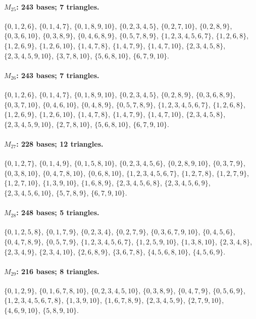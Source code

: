 \paragraph{$M_{25}$: 243 bases; 7 triangles.}
\(\{0,1,2,6\}\), \(\{0,1,4,7\}\), \(\{0,1,8,9,10\}\), \(\{0,2,3,4,5\}\), \(\{0,2,7,10\}\), \(\{0,2,8,9\}\), \(\{0,3,6,10\}\), \(\{0,3,8,9\}\), \(\{0,4,6,8,9\}\), \(\{0,5,7,8,9\}\), \(\{1,2,3,4,5,6,7\}\), \(\{1,2,6,8\}\), \(\{1,2,6,9\}\), \(\{1,2,6,10\}\), \(\{1,4,7,8\}\), \(\{1,4,7,9\}\), \(\{1,4,7,10\}\), \(\{2,3,4,5,8\}\), \(\{2,3,4,5,9,10\}\), \(\{3,7,8,10\}\), \(\{5,6,8,10\}\), \(\{6,7,9,10\}\).

\paragraph{$M_{26}$: 243 bases; 7 triangles.}
\(\{0,1,2,6\}\), \(\{0,1,4,7\}\), \(\{0,1,8,9,10\}\), \(\{0,2,3,4,5\}\), \(\{0,2,8,9\}\), \(\{0,3,6,8,9\}\), \(\{0,3,7,10\}\), \(\{0,4,6,10\}\), \(\{0,4,8,9\}\), \(\{0,5,7,8,9\}\), \(\{1,2,3,4,5,6,7\}\), \(\{1,2,6,8\}\), \(\{1,2,6,9\}\), \(\{1,2,6,10\}\), \(\{1,4,7,8\}\), \(\{1,4,7,9\}\), \(\{1,4,7,10\}\), \(\{2,3,4,5,8\}\), \(\{2,3,4,5,9,10\}\), \(\{2,7,8,10\}\), \(\{5,6,8,10\}\), \(\{6,7,9,10\}\).

\paragraph{$M_{27}$: 228 bases; 12 triangles.}
\(\{0,1,2,7\}\), \(\{0,1,4,9\}\), \(\{0,1,5,8,10\}\), \(\{0,2,3,4,5,6\}\), \(\{0,2,8,9,10\}\), \(\{0,3,7,9\}\), \(\{0,3,8,10\}\), \(\{0,4,7,8,10\}\), \(\{0,6,8,10\}\), \(\{1,2,3,4,5,6,7\}\), \(\{1,2,7,8\}\), \(\{1,2,7,9\}\), \(\{1,2,7,10\}\), \(\{1,3,9,10\}\), \(\{1,6,8,9\}\), \(\{2,3,4,5,6,8\}\), \(\{2,3,4,5,6,9\}\), \(\{2,3,4,5,6,10\}\), \(\{5,7,8,9\}\), \(\{6,7,9,10\}\).

\paragraph{$M_{28}$: 248 bases; 5 triangles.}
\(\{0,1,2,5,8\}\), \(\{0,1,7,9\}\), \(\{0,2,3,4\}\), \(\{0,2,7,9\}\), \(\{0,3,6,7,9,10\}\), \(\{0,4,5,6\}\), \(\{0,4,7,8,9\}\), \(\{0,5,7,9\}\), \(\{1,2,3,4,5,6,7\}\), \(\{1,2,5,9,10\}\), \(\{1,3,8,10\}\), \(\{2,3,4,8\}\), \(\{2,3,4,9\}\), \(\{2,3,4,10\}\), \(\{2,6,8,9\}\), \(\{3,6,7,8\}\), \(\{4,5,6,8,10\}\), \(\{4,5,6,9\}\).

\paragraph{$M_{29}$: 216 bases; 8 triangles.}
\(\{0,1,2,9\}\), \(\{0,1,6,7,8,10\}\), \(\{0,2,3,4,5,10\}\), \(\{0,3,8,9\}\), \(\{0,4,7,9\}\), \(\{0,5,6,9\}\), \(\{1,2,3,4,5,6,7,8\}\), \(\{1,3,9,10\}\), \(\{1,6,7,8,9\}\), \(\{2,3,4,5,9\}\), \(\{2,7,9,10\}\), \(\{4,6,9,10\}\), \(\{5,8,9,10\}\).

